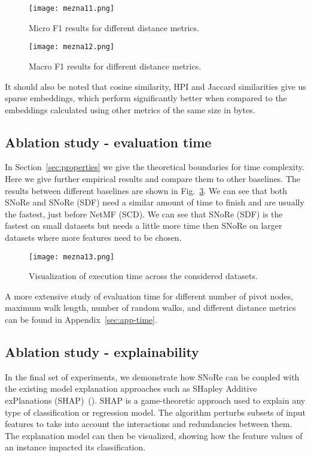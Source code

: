\documentclass[twoside,11pt]{article}
\begin{document}
\begin{figure}[t!]
  \centering
  \texttt{[image: mezna11.png]}
  \caption{Micro F1 results for different distance metrics.}
  \label{fig:micrometric}
\end{figure}

\begin{figure}[t!]
  \centering
  \texttt{[image: mezna12.png]}
  \caption{Macro F1 results for different distance metrics.}
  \label{fig:macrometric}
\end{figure}

It should also be noted that cosine similarity, HPI and Jaccard similarities give us sparse embeddings, which perform significantly better when compared to the embeddings calculated using other metrics of the same size in bytes.

\subsection{Ablation study - evaluation time}
\label{sec:eval-times}
In Section~\ref{sec:properties} we give the theoretical boundaries for time complexity. Here we give further empirical results and compare them to other baselines. The results between different baselines are shown in Fig.~\ref{fig:time}. We can see that both SNoRe and SNoRe (SDF) need a similar amount of time to finish and are usually the fastest, just before NetMF (SCD). We can see that SNoRe (SDF) is the fastest on small datasets but needs a little more time then SNoRe on larger datasets where more features need to be chosen.

\begin{figure}[t!]
  \centering
  \texttt{[image: mezna13.png]}
  \caption{Visualization of execution time across the considered datasets.}
  \label{fig:time}
\end{figure}

A more extensive study of evaluation time for different number of pivot nodes, maximum walk length, number of random walks, and different distance metrics can be found in Appendix~\ref{sec:app-time}.

\subsection{Ablation study - explainability}
\label{sec:ablation-explainability}
In the final set of experiments, we demonstrate how SNoRe can be coupled with the existing model explanation approaches such as SHapley Additive exPlanations (SHAP)~(\cite{lundberg2017shap,vstrumbelj2014explaining}). SHAP is a game-theoretic approach used to explain any type of classification or regression model. The algorithm perturbs subsets of input features to take into account the interactions and redundancies between them. The explanation model can then be visualized, showing how the feature values of an instance impacted its classification.
\end{document}
